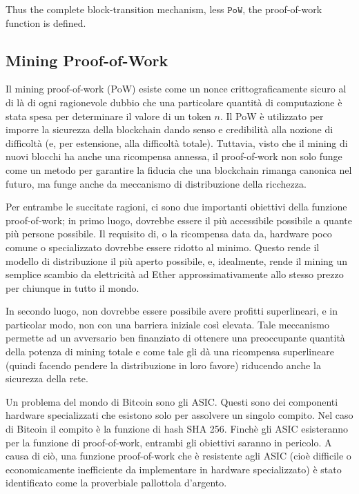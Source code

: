\documentclass[9pt,oneside]{amsart}
\begin{document}
\begin{multicols}{2}
Thus the complete block-transition mechanism, less $\mathtt{PoW}$, the proof-of-work function is defined.

\subsection{Mining Proof-of-Work} \label{ch:pow}

Il mining proof-of-work (PoW) esiste come un nonce crittograficamente sicuro al di là di ogni ragionevole dubbio che una particolare quantità di computazione è stata spesa per determinare il valore di un token $n$. Il PoW è utilizzato per imporre la sicurezza della blockchain dando senso e credibilità alla nozione di difficoltà (e, per estensione, alla difficoltà totale). Tuttavia, visto che il mining di nuovi blocchi ha anche una ricompensa annessa, il proof-of-work non solo funge come un metodo per garantire la fiducia che una blockchain rimanga canonica nel futuro, ma funge anche da meccanismo di distribuzione della ricchezza.

Per entrambe le succitate ragioni, ci sono due importanti obiettivi della funzione proof-of-work; in primo luogo, dovrebbe essere il più accessibile possibile a quante più persone possibile. Il requisito di, o la ricompensa data da, hardware poco comune o specializzato dovrebbe essere ridotto al minimo. Questo rende il modello di distribuzione il più aperto possibile, e, idealmente, rende il mining un semplice scambio da elettricità ad Ether approssimativamente allo stesso prezzo per chiunque in tutto il mondo.

In secondo luogo, non dovrebbe essere possibile avere profitti superlineari, e in particolar modo, non con una barriera iniziale così elevata. Tale meccanismo permette ad un avversario ben finanziato di ottenere una preoccupante quantità della potenza di mining totale e come tale gli dà una ricompensa superlineare (quindi facendo pendere la distribuzione in loro favore) riducendo anche la sicurezza della rete.

Un problema del mondo di Bitcoin sono gli ASIC. Questi sono dei componenti hardware specializzati che esistono solo per assolvere un singolo compito. Nel caso di Bitcoin il compito è la funzione di hash SHA 256. Finchè gli ASIC esisteranno per la funzione di proof-of-work, entrambi gli obiettivi saranno in pericolo. A causa di ciò, una funzione proof-of-work che è resistente agli ASIC (cioè difficile o economicamente inefficiente da implementare in hardware specializzato) è stato identificato come la proverbiale pallottola d'argento.


\end{multicols}
\end{document}
